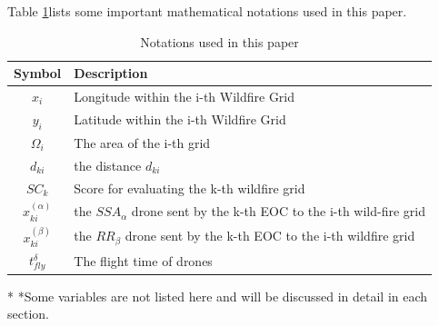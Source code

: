 \documentclass[12pt]{ctexart}
\begin{document}
Table \ref{tb:notation}lists some important mathematical notations used in this paper.
\begin{table}[htbp]%
  \begin{center}
    \caption{Notations used in this paper}
    \begin{tabular}{cl}
      \toprule[1.5pt]
      \multicolumn{1}{m{4cm}}{\centering \textbf{Symbol}}
                            & \multicolumn{1}{m{10cm}}{\textbf{ Description} }                       \\
      \midrule
      $x_i$                 & Longitude within the i-th Wildfire Grid                                \\
      $y_i$                 & Latitude within the i-th Wildfire Grid                                 \\
      $\varOmega _i$        & The area of the i-th grid                                              \\
      $d_{ki}$              & the distance $d_{ki}$                                                  \\
      $SC_k$                & Score for evaluating the k-th wildfire grid                            \\
      \vspace{5pt}%
      $x^{( \alpha )}_{ki}$ & the $SSA_\alpha$ drone sent by the k-th EOC to the i-th wild-fire grid \\
      \vspace{3pt}
      $x^{( \beta )}_{ki}$  & the $RR_\beta$ drone sent by the k-th EOC to the i-th wildfire grid    \\
      $t_{fly}^{\delta}$    & The flight time of drones                                              \\
      \bottomrule[1.5pt]
    \end{tabular}\label{tb:notation}
    \begin{tablenotes}
      \footnotesize
      \item[*] *Some variables are not listed here and will be discussed in detail in each section. %
    \end{tablenotes}
  \end{center}
\end{table}
\vspace{-1cm}%
\end{document}
